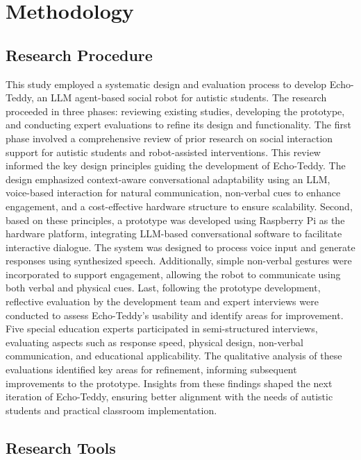 
\section{Methodology}

\subsection{Research Procedure}

This study employed a systematic design and evaluation process to develop Echo-Teddy, an LLM agent-based social robot for autistic students. The research proceeded in three phases: reviewing existing studies, developing the prototype, and conducting expert evaluations to refine its design and functionality. The first phase involved a comprehensive review of prior research on social interaction support for autistic students and robot-assisted interventions. This review informed the key design principles guiding the development of Echo-Teddy. The design emphasized context-aware conversational adaptability using an LLM, voice-based interaction for natural communication, non-verbal cues to enhance engagement, and a cost-effective hardware structure to ensure scalability.
Second, based on these principles, a prototype was developed using Raspberry Pi as the hardware platform, integrating LLM-based conversational software to facilitate interactive dialogue. The system was designed to process voice input and generate responses using synthesized speech. Additionally, simple non-verbal gestures were incorporated to support engagement, allowing the robot to communicate using both verbal and physical cues. Last, following the prototype development, reflective evaluation by the development team and expert interviews were conducted to assess Echo-Teddy’s usability and identify areas for improvement. Five special education experts participated in semi-structured interviews, evaluating aspects such as response speed, physical design, non-verbal communication, and educational applicability. The qualitative analysis of these evaluations identified key areas for refinement, informing subsequent improvements to the prototype. Insights from these findings shaped the next iteration of Echo-Teddy, ensuring better alignment with the needs of autistic students and practical classroom implementation.

\subsection{Research Tools}

